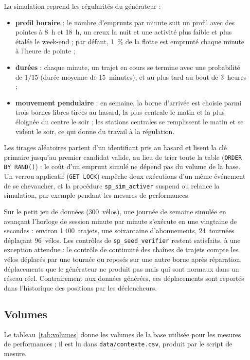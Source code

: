 La simulation reprend les régularités du générateur :
\begin{itemize}
	\item \textbf{profil horaire} : le nombre d'emprunts par minute suit un profil avec des pointes à 8~h et 18~h, un creux la nuit et une activité plus faible et plus étalée le week-end ; par défaut, 1~\% de la flotte est emprunté chaque minute à l'heure de pointe ;
	\item \textbf{durées} : chaque minute, un trajet en cours se termine avec une probabilité de $1/15$ (durée moyenne de 15~minutes), et au plus tard au bout de 3~heures ;
	\item \textbf{mouvement pendulaire} : en semaine, la borne d'arrivée est choisie parmi trois bornes libres tirées au hasard, la plus centrale le matin et la plus éloignée du centre le soir ; les stations centrales se remplissent le matin et se vident le soir, ce qui donne du travail à la régulation.
\end{itemize}

Les tirages aléatoires partent d'un identifiant pris au hasard et lisent la clé primaire jusqu'au premier candidat valide, au lieu de trier toute la table (\texttt{ORDER BY RAND()}) : le coût d'un emprunt simulé ne dépend pas du volume de la base. Un verrou applicatif (\texttt{GET\_LOCK}) empêche deux exécutions d'un même événement de se chevaucher, et la procédure \texttt{sp\_sim\_activer} suspend ou relance la simulation, par exemple pendant les mesures de performances.

Sur le petit jeu de données (300~vélos), une journée de semaine simulée en avançant l'horloge de session minute par minute s'exécute en une vingtaine de secondes : environ 1\,400~trajets, une soixantaine d'abonnements, 24~tournées déplaçant 96~vélos. Les contrôles de \texttt{sp\_seed\_verifier} restent satisfaits, à une exception attendue : le contrôle de continuité des chaînes de trajets compte les vélos déplacés par une tournée ou reposés sur une autre borne après réparation, déplacements que le générateur ne produit pas mais qui sont normaux dans un réseau réel. Contrairement aux données générées, ces déplacements sont reportés dans l'historique des positions par les déclencheurs.

\subsection{Volumes}

Le tableau~\ref{tab:volumes} donne les volumes de la base utilisée pour les mesures de performances ; il est lu dans \texttt{data/contexte.csv}, produit par le script de mesure.

